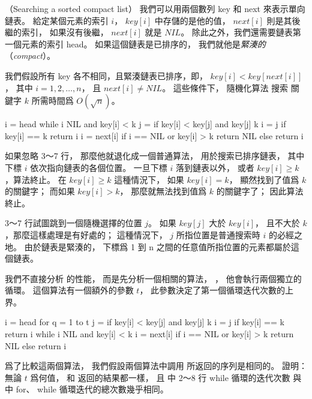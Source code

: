 \startPROBLEM
（Searching a sorted compact list）
我們可以用兩個數列 key 和 next 來表示單向鏈表。
給定某個元素的索引 $i$，
 $key[i]$ 中存儲的是他的值，
 $next[i]$ 則是其後繼的索引，
如果沒有後繼， $next[i]$ 就是 $NIL$。
除此之外，我們還需要鏈表第一個元素的索引 head。
如果這個鏈表是已排序的，
我們就他是\emph{緊湊的}（\emph{compact}）。

我們假設所有 key 各不相同，且緊湊鏈表已排序，即，
 $key[i] < key[next[i]]$，
其中 $i=1,2,\ldots,n$，
且 $next[i] \ne NIL$。
這些條件下，
隨機化算法  搜索
關鍵字 $k$ 所需時間爲 $O(\sqrt{n})$。

\startCLRSCODE
i = head
while i \ne NIL and key[i] < k
	j = 
	if key[i] < key[j] and key[j] \le k
		i = j
		if key[i] == k
			return i
	i = next[i]
if i == NIL or key[i] > k
	return NIL
else
	return i
\stopCLRSCODE

如果忽略 3～7 行，
那麼他就退化成一個普通算法，
用於搜索已排序鏈表，
其中下標 $i$ 依次指向鏈表的各個位置。
一旦下標 $i$ 落到鏈表以外，
或者 $key[i]\ge k$，算法終止。
在 $key[i]\ge k$ 這種情況下，
如果 $key[i] = k$，
顯然找到了值爲 $k$ 的關鍵字；
而如果 $key[i] > k$，
那麼就無法找到值爲 $k$ 的關鍵字了；
因此算法終止。

3～7 行試圖跳到一個隨機選擇的位置 $j$。
如果 $key[j]$ 大於 $key[i]$，
且不大於 $k$，那麼這樣處理是有好處的；
這種情況下， $j$ 所指位置是普通搜索時 $i$ 的必經之地。
由於鏈表是緊湊的，
下標爲 1 到 n 之間的任意值所指位置的元素都屬於這個鏈表。

我們不直接分析  的性能，
而是先分析一個相關的算法， ，
他會執行兩個獨立的循環。
這個算法有一個額外的參數 $t$，
此參數決定了第一個循環迭代次數的上界。

\startCLRSCODE
i = head
for q = 1 to t
	j = 
	if key[i] < key[j] and key[j] \le k
		i = j
		if key[i] == k
			return i
while i \ne NIL and key[i] < k
	i = next[i]
if i == NIL or key[i] > k
	return NIL
else
	return i
\stopCLRSCODE

爲了比較這兩個算法，
我們假設兩個算法中調用  所返回的序列是相同的。
\startigBase[a]\startitem
證明：無論 $t$ 爲何值，
  和
  返回的結果都一樣，
且  中 2～8 行 while 循環的迭代次數
與  中 for、 while 循環迭代的總次數幾乎相同。
\stopitem\stopigBase

